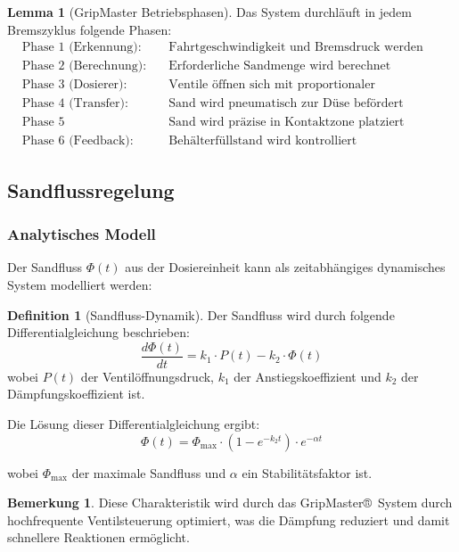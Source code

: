 \documentclass[a4paper,12pt]{article}
\theoremstyle{definition}
\newtheorem{definition}{Definition}
\newtheorem{lemma}{Lemma}
\newtheorem{bemerkung}{Bemerkung}
\begin{document}
\begin{lemma}[GripMaster Betriebsphasen]
	Das System durchläuft in jedem Bremszyklus folgende Phasen:
	\begin{align*}
		&\text{Phase 1 (Erkennung):} && \text{Fahrtgeschwindigkeit und Bremsdruck werden erfasst} \\
		&\text{Phase 2 (Berechnung):} && \text{Erforderliche Sandmenge wird berechnet} \\
		&\text{Phase 3 (Dosierer):} && \text{Ventile öffnen sich mit proportionaler Charakteristik} \\
		&\text{Phase 4 (Transfer):} && \text{Sand wird pneumatisch zur Düse befördert} \\
		&\text{Phase 5 (Ausbringung):} && \text{Sand wird präzise in Kontaktzone platziert} \\
		&\text{Phase 6 (Feedback):} && \text{Behälterfüllstand wird kontrolliert}
	\end{align*}
\end{lemma}

\subsection{Sandflussregelung}

\subsubsection{Analytisches Modell}

Der Sandfluss $\Phi(t)$ aus der Dosiereinheit kann als zeitabhängiges dynamisches System modelliert werden:

\begin{definition}[Sandfluss-Dynamik]
	Der Sandfluss wird durch folgende Differentialgleichung beschrieben:
	\[
	\frac{d\Phi(t)}{dt} = k_1 \cdot P(t) - k_2 \cdot \Phi(t)
	\]
	wobei $P(t)$ der Ventilöffnungsdruck, $k_1$ der Anstiegskoeffizient und $k_2$ der Dämpfungskoeffizient ist.
\end{definition}

Die Lösung dieser Differentialgleichung ergibt:
\begin{equation}
	\Phi(t) = \Phi_{\max} \cdot (1 - e^{-k_2 t}) \cdot e^{-\alpha t}
	\label{eq:sandflow}
\end{equation}

wobei $\Phi_{\max}$ der maximale Sandfluss und $\alpha$ ein Stabilitätsfaktor ist.

\begin{bemerkung}
	Diese Charakteristik wird durch das GripMaster®~System durch hochfrequente Ventilsteuerung optimiert, was die Dämpfung reduziert und damit schnellere Reaktionen ermöglicht.
\end{bemerkung}
\end{document}
